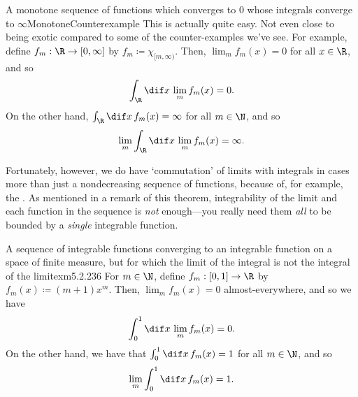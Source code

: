 \begin{exm}{A monotone sequence of functions which converges to $0$ whose integrals converge to $\infty$}{MonotoneCounterexample}
This is actually quite easy.  Not even close to being exotic compared to some of the counter-examples we've see.  For example, define $f_m:\R \rightarrow [0,\infty ]$ by $f_m\coloneqq \chi _{[m,\infty )}$.  Then, $\lim _mf_m(x)=0$ for all $x\in \R$, and so
\begin{equation}
\int _{\R}\dif x\, \lim _mf_m(x)=0.
\end{equation}
On the other hand, $\int _{\R}\dif x\, f_m(x)=\infty$ for all $m\in \N$, and so
\begin{equation}
\lim _m\int _{\R}\dif x\, \lim _mf_m(x)=\infty .
\end{equation}
\end{exm}
Fortunately, however, we do have `commutation' of limits with integrals in cases more than just a nondecreasing sequence of functions, because of, for example, the .  As mentioned in a remark of this theorem, integrability of the limit and each function in the sequence is \emph{not} enough---you really need them \emph{all} to be bounded by a \emph{single} integrable function.
\begin{exm}{A sequence of integrable functions converging to an integrable function on a space of finite measure, but for which the limit of the integral is not the integral of the limit}{exm5.2.236}
For $m\in \N$, define $f_m:[0,1]\rightarrow \R$ by $f_m(x)\coloneqq (m+1)x^m$.  Then, $\lim _mf_m(x)=0$ almost-everywhere, and so we have
\begin{equation}
\int _0^1\dif x\, \lim _mf_m(x)=0.
\end{equation}
On the other hand, we have that $\int _0^1\dif x\, f_m(x)=1$ for all $m\in \N$, and so
\begin{equation}
\lim _m\int _0^1\dif x\, f_m(x)=1.
\end{equation}
\end{exm}


